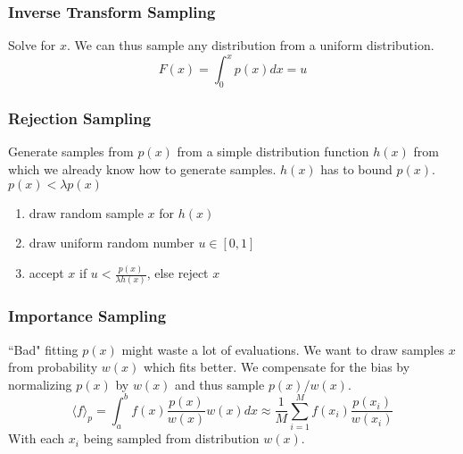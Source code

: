     \subsubsection{Inverse Transform Sampling}
        Solve for $x$. We can thus sample any distribution from a uniform distribution.
        \begin{equation*}
            F(x) = \int_0^x p(x)dx = u
        \end{equation*}
    
    \subsubsection{Rejection Sampling}
        Generate samples from $p(x)$ from a simple distribution function $h(x)$ from which we already know how to generate samples. $h(x)$ has to bound $p(x)$. $p(x) < \lambda p(x)$
        \begin{enumerate}
            \item draw random sample $x$ for $h(x)$
            \item draw uniform random number $u\in[0,1]$
            \item accept $x$ if $u < \frac{p(x)}{\lambda h(x)}$, else reject $x$
        \end{enumerate}
    
    \subsubsection{Importance Sampling}
        ``Bad" fitting $p(x)$ might waste a lot of evaluations. We want to draw samples $x$ from probability $w(x)$ which fits better. We compensate for the bias by normalizing $p(x)$ by $w(x)$ and thus sample $p(x)/w(x)$.
        \begin{equation*}
            \langle f \rangle_p = \int_a^b f(x)\frac{p(x)}{w(x)}w(x)dx \approx \frac{1}{M}\sum_{i=1}^M f(x_i)\frac{p(x_i)}{w(x_i)}
        \end{equation*}
        With each $x_i$ being sampled from distribution $w(x)$.
    

